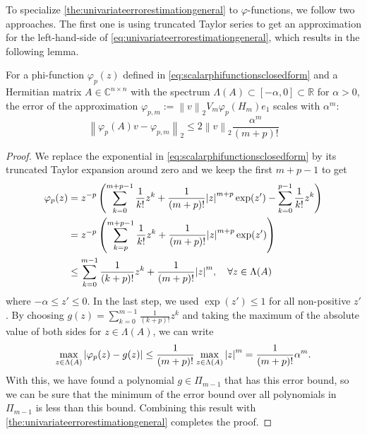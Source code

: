 To specialize \autoref{the:univariateerrorestimationgeneral} to $\varphi$-functions,
we follow two approaches. The first one is using truncated Taylor series to get an
approximation for the left-hand-side of \eqref{eq:univariateerrorestimationgeneral},
which results in the following lemma.

\begin{lemma}
    \label{lem:univariateerrorestimationphitaylor}
    For a phi-function $\varphi_p(z)$ defined in \eqref{eq:scalarphifunctionsclosedform}
    and a Hermitian matrix $A \in \mathbb{C}^{n \times n}$ with the spectrum
    $\Lambda(A) \subset [-\alpha, 0] \subset \mathbb{R}$ for $\alpha > 0$,
    the error of the approximation
    $\varphi_{p, m} := \left\| v \right\|_{2} V_m \varphi_p(H_m) e_1$
    scales with $\alpha^m$:
    \begin{equation}
        \label{eq:univariateerrorestimationphitaylor}
        \left\| \varphi_p(A)v - \varphi_{p, m} \right\|_2 \le 2 \left\| v \right\|_2
        \frac{\alpha^m}{(m+p)!}
    \end{equation}
\end{lemma}
\begin{proof}
    We replace the exponential in \eqref{eq:scalarphifunctionsclosedform} by its
    truncated Taylor expansion around zero and we keep the first $m+p-1$ to get
    \begin{equation*}
        \begin{aligned}
            \varphi_p(z) & = z^{-p} \left( \sum_{k=0}^{m+p-1}{\frac{1}{k!}z^k}
                + \frac{1}{(m+p)!} \abs{z}^{m+p} \exp(z') - \sum_{k=0}^{p-1}{\frac{1}{k!}z^{k}} \right)\\
            & = z^{-p} \left( \sum_{k=p}^{m+p-1}{\frac{1}{k!}z^k} + \frac{1}{(m+p)!} \abs{z}^{m+p} \exp(z') \right)\\
            & \le \sum_{k=0}^{m-1}{\frac{1}{(k+p)!}z^k} + \frac{1}{(m+p)!} \abs{z}^{m}, \quad \forall z \in \Lambda(A)
            \end{aligned}
    \end{equation*}
    where $-\alpha \le z' \le 0$. In the last step, we used $\exp(z') \le 1$ for all
    non-positive $z'$. By choosing $g(z) = \sum_{k=0}^{m-1}{\frac{1}{(k+p)!}z^k}$ and
    taking the maximum of the absolute value of both sides for $z \in \Lambda(A)$,
    we can write
    \begin{equation*}
        \max_{z \in \Lambda(A)}\left| \varphi_p(z) - g(z) \right|
        \le \frac{1}{(m+p)!} \max_{z \in \Lambda(A)}\abs{z}^{m}
        = \frac{1}{(m+p)!} \alpha^m.
    \end{equation*}
    With this, we have found a polynomial $g \in \Pi_{m-1}$ that has this error bound,
    so we can be sure that the minimum of the error bound over all polynomials in
    $\Pi_{m-1}$ is less than this bound. Combining this result with
    \autoref{the:univariateerrorestimationgeneral} completes the proof.
\end{proof}


